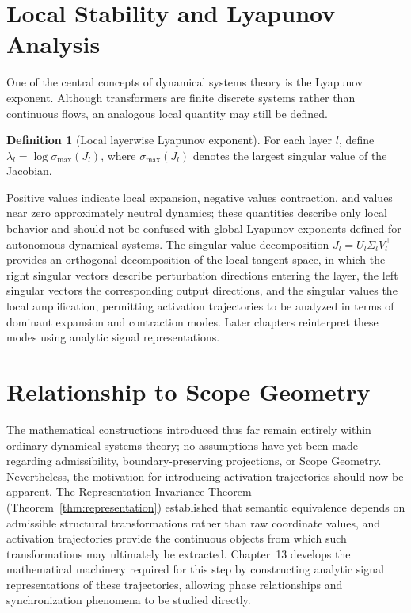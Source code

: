 \documentclass[11pt,twoside,openright]{book}
\numberwithin{equation}{chapter}
\theoremstyle{definition}
\newtheorem{definition}{Definition}[chapter]
\theoremstyle{plain}
\theoremstyle{remark}
\theoremstyle{definition}
\begin{document}
\section{Local Stability and Lyapunov Analysis}

One of the central concepts of dynamical systems theory is the Lyapunov
exponent. Although transformers are finite discrete systems rather than
continuous flows, an analogous local quantity may still be defined.

\begin{definition}[Local layerwise Lyapunov exponent]
For each layer $l$, define $\lambda_l=\log\sigma_{\max}(J_l)$, where
$\sigma_{\max}(J_l)$ denotes the largest singular value of the Jacobian.
\end{definition}

Positive values indicate local expansion, negative values contraction,
and values near zero approximately neutral dynamics; these quantities
describe only local behavior and should not be confused with global
Lyapunov exponents defined for autonomous dynamical systems. The singular
value decomposition $J_l=U_l\Sigma_lV_l^{\top}$ provides an orthogonal
decomposition of the local tangent space, in which the right singular
vectors describe perturbation directions entering the layer, the left
singular vectors the corresponding output directions, and the singular
values the local amplification, permitting activation trajectories to be
analyzed in terms of dominant expansion and contraction modes. Later
chapters reinterpret these modes using analytic signal representations.

\section{Relationship to Scope Geometry}

The mathematical constructions introduced thus far remain entirely within
ordinary dynamical systems theory; no assumptions have yet been made
regarding admissibility, boundary-preserving projections, or Scope
Geometry. Nevertheless, the motivation for introducing activation
trajectories should now be apparent. The Representation Invariance
Theorem (Theorem~\ref{thm:representation}) established that semantic
equivalence depends on admissible structural transformations rather than
raw coordinate values, and activation trajectories provide the continuous
objects from which such transformations may ultimately be extracted.
Chapter~13 develops the mathematical machinery required for this step by
constructing analytic signal representations of these trajectories,
allowing phase relationships and synchronization phenomena to be studied
directly.
\end{document}
